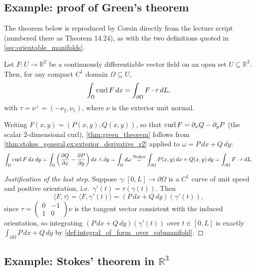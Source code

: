 \subsection{Example: proof of Green's theorem}
\label{sec:green_theorem_proof}

\begin{ainote}
The theorem below is reproduced by Corsin directly from the lecture script (numbered there as
Theorem 14.24), as with the two definitions quoted in \cref{sec:orientable_manifolds}.
\end{ainote}

\begin{theorem}
\label{thm:green_theorem}
Let $F : U \to \mathbb{R}^2$ be a continuously differentiable vector field on an open set
$U \subseteq \mathbb{R}^2$. Then, for any compact $C^1$ domain $\Omega \subseteq U$,
\[\int_\Omega \operatorname{curl} F\,dx = \int_{\partial\Omega} F\cdot\tau\,dL,\]
with $\tau = \nu^\perp = (-\nu_2,\nu_1)$, where $\nu$ is the exterior unit normal.
\end{theorem}

Writing $F(x,y) = (P(x,y),Q(x,y))$, so that $\operatorname{curl} F = \partial_xQ - \partial_yP$ (the scalar
$2$-dimensional curl), \cref{thm:green_theorem} follows from
\cref{thm:stokes_general,ex:exterior_derivative_r2} applied to $\omega = P\,dx+Q\,dy$:
\[
\int_\Omega \operatorname{curl} F\,dx\,dy = \int_\Omega \left(\frac{\partial Q}{\partial x} -
  \frac{\partial P}{\partial y}\right) dx\wedge dy = \int_\Omega d\omega
  \overset{\text{Stokes}}{=} \int_{\partial\Omega} P(x,y)\,dx + Q(x,y)\,dy
  = \int_{\partial\Omega} F\cdot\tau\,dL.
\]

\begin{proof}[Justification of the last step]
Suppose $\gamma : [0,L] \to \partial\Omega$ is a $C^1$ curve of unit speed and positive
orientation, i.e.\ $\gamma'(t) = \tau(\gamma(t))$. Then
\[\langle F,\tau\rangle = \langle F,\gamma'(t)\rangle = (P\,dx+Q\,dy)(\gamma'(t)),\]
since $\tau = \begin{pmatrix}0&-1\\1&0\end{pmatrix}\nu$ is the tangent vector consistent with
the induced orientation, so integrating $(P\,dx+Q\,dy)(\gamma'(t))$ over $t \in [0,L]$ is
exactly $\int_{\partial\Omega} P\,dx+Q\,dy$ by \cref{def:integral_of_form_over_submanifold}.
\end{proof}

\subsection{Example: Stokes' theorem in \texorpdfstring{$\mathbb{R}^3$}{R\^{}3}}
\label{sec:stokes_in_r3}

